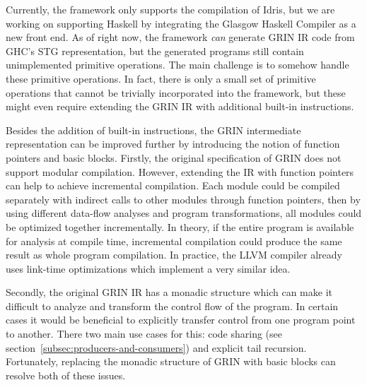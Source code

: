 \documentclass[main.tex]{subfiles}
\begin{document}
	
	Currently, the framework only supports the compilation of Idris, but we are working on supporting Haskell by integrating the Glasgow Haskell Compiler as a new front end. As of right now, the framework \emph{can} generate GRIN IR code from GHC's STG representation, but the generated programs still contain unimplemented primitive operations. The main challenge is to somehow handle these primitive operations. In fact, there is only a small set of primitive operations that cannot be trivially incorporated into the framework, but these might even require extending the GRIN IR with additional built-in instructions.
	
	Besides the addition of built-in instructions, the GRIN intermediate representation can be improved further by introducing the notion of function pointers and basic blocks. Firstly, the original specification of GRIN does not support modular compilation. However, extending the IR with function pointers can help to achieve incremental compilation. Each module could be compiled separately with indirect calls to other modules through function pointers, then by using different data-flow analyses and program transformations, all modules could be optimized together incrementally. In theory, if the entire program is available for analysis at compile time, incremental compilation could produce the same result as whole program compilation. In practice, the LLVM compiler already uses link-time optimizations which implement a very similar idea.
	
	Secondly, the original GRIN IR has a monadic structure which can make it difficult to analyze and transform the control flow of the program. In certain cases it would be beneficial to explicitly transfer control from one program point to another. There two main use cases for this: code sharing (see section~\ref{subsec:producers-and-consumers}) and explicit tail recursion. Fortunately, replacing the monadic structure of GRIN with basic blocks can resolve both of these issues.
	
\end{document}
